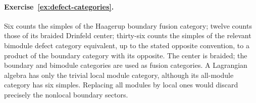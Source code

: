 \paragraph{Exercise~\ref{ex:defect-categories}.}
\label{sol:ex:defect-categories}
Six counts the simples of the Haagerup boundary fusion
category; twelve counts those of its braided Drinfeld center;
thirty-six counts the simples of the relevant bimodule defect
category equivalent, up to the stated opposite convention,
to a product of the boundary category with its opposite.
The center is braided; the boundary and bimodule categories
are used as fusion categories. A Lagrangian algebra has
only the trivial local module category, although its all-module
category has six simples. Replacing all modules by local
ones would discard precisely the nonlocal boundary sectors.

